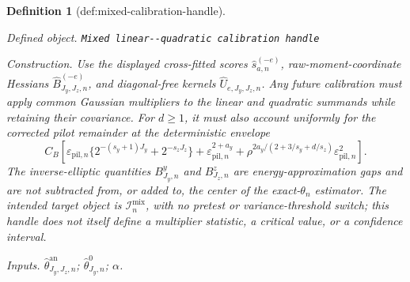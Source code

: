 \documentclass{article}
\newtheorem{definition}{Definition}
\begin{document}
\begin{definition}[def:mixed-calibration-handle]\label{def:mixed-calibration-handle}
\par\smallskip\noindent\emph{Defined object.} \texttt{Mixed linear-\allowbreak{}-\allowbreak{}quadratic calibration handle}
\par\smallskip\noindent\emph{Construction.} Use the displayed cross-fitted scores \(\widehat s_{a,n}^{(-e)}\), raw-moment-coordinate Hessians \(\widehat B_{J_y,J_z,n}^{(-e)}\), and diagonal-free kernels \(\widehat U_{e,J_y,J_z,n}\). Any future calibration must apply common Gaussian multipliers to the linear and quadratic summands while retaining their covariance.  For \(d\ge1\), it must also account uniformly for the corrected pilot remainder at the deterministic envelope
\[
C_B\left[
\varepsilon_{\mathrm{pil},n}
\{2^{-(s_y+1)J_y}+2^{-s_zJ_z}\}
+\varepsilon_{\mathrm{pil},n}^{2+a_y}
+\rho^{2a_y/(2+3/s_y+d/s_z)}\varepsilon_{\mathrm{pil},n}^2
\right].
\]
The inverse-elliptic quantities \(B^y_{J_y,n}\) and \(B^z_{J_z,n}\) are energy-approximation gaps and are not subtracted from, or added to, the center of the exact-\(\theta_n\) estimator.  The intended target object is \(\mathcal I_n^{\mathrm{mix}}\), with no pretest or variance-threshold switch; this handle does not itself define a multiplier statistic, a critical value, or a confidence interval.
\par\smallskip\noindent\emph{Inputs.} \(\widehat\theta^{\mathrm{an}}_{J_y,J_z,n}\); \(\widehat\theta^0_{J_y,n}\); \(\alpha\).
\end{definition}
\end{document}
